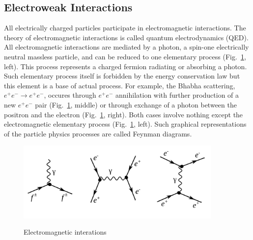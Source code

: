 \subsection{Electroweak Interactions}
\label{sec:Intro_Electroweak}

All electrically charged particles participate in electromagnetic interactions. The theory of electromagnetic interactions is called quantum electrodynamics (QED). All electromagnetic interactions are mediated by a photon, a spin-one electrically neutral massless particle, and can be reduced to one elementary process (Fig.~\ref{fig:feynmEM}, left). This process represents a charged fermion radiating or absorbing a photon. Such elementary process itself is forbidden by the energy conservation law but this element is a base of actual process. For example, the Bhabha scattering, $e^+e^- \rightarrow e^+e^-$, occures through $e^+e^-$ annihilation with further production of a new $e^+e^-$ pair (Fig.~\ref{fig:feynmEM}, middle) or through exchange of a photon between the positron and the electron (Fig.~\ref{fig:feynmEM}, right). Both cases involve nothing except the electromagnetic elementary process (Fig.~\ref{fig:feynmEM}, left). Such graphical representations of the particle physics processes are called Feynman diagrams.\\ 

\begin{figure}[htb]
  \begin{center}
    {\includegraphics[width=0.90\textwidth]{../figs/Intro/feynmEM.png}}
    \caption{Electromagnetic interations}
    \label{fig:feynmEM}
  \end{center}
\end{figure}

